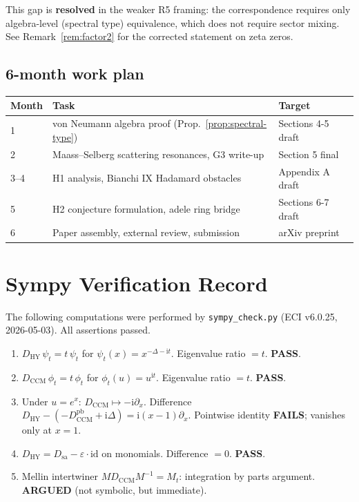 \documentclass[11pt]{article}
\newcommand{\HY}{\mathrm{HY}}
\newcommand{\CCM}{\mathrm{CCM}}
\newcommand{\ii}{\mathrm{i}}
\newcommand{\eps}{\varepsilon}
\newcommand{\Del}{\Delta}
\begin{document}
This gap is \textbf{resolved} in the weaker R5 framing: the
correspondence requires only algebra-level (spectral type) equivalence,
which does not require sector mixing. See Remark~\ref{rem:factor2}
for the corrected statement on zeta zeros.

\subsection{6-month work plan}

\begin{center}
\begin{tabular}{lll}
\hline
\textbf{Month} & \textbf{Task} & \textbf{Target} \\
\hline
1 & von Neumann algebra proof (Prop.~\ref{prop:spectral-type}) & Sections 4-5 draft \\
2 & Maass--Selberg scattering resonances, G3 write-up & Section 5 final \\
3--4 & H1 analysis, Bianchi IX Hadamard obstacles & Appendix A draft \\
5 & H2 conjecture formulation, adele ring bridge & Sections 6-7 draft \\
6 & Paper assembly, external review, submission & arXiv preprint \\
\hline
\end{tabular}
\end{center}

\appendix
\section{Sympy Verification Record}
\label{app:sympy}

The following computations were performed by \texttt{sympy\_check.py}
(ECI v6.0.25, 2026-05-03). All assertions passed.

\begin{enumerate}
\item[Block 1.] $D_\HY\,\psi_t = t\,\psi_t$ for $\psi_t(x) = x^{-\Del-\ii t}$.
  Eigenvalue ratio $= t$. \textbf{PASS}.
\item[Block 2.] $D_\CCM\,\phi_t = t\,\phi_t$ for $\phi_t(u) = u^{\ii t}$.
  Eigenvalue ratio $= t$. \textbf{PASS}.
\item[Block 3.] Under $u = e^x$: $D_\CCM \mapsto -\ii\partial_x$.
  Difference $D_\HY - (-D_\CCM^{\mathrm{pb}} + \ii\Del) = \ii(x-1)\partial_x$.
  Pointwise identity \textbf{FAILS}; vanishes only at $x=1$.
\item[Block 4.] $D_\HY = D_{\mathrm{sa}} - \eps\cdot\mathrm{id}$ on monomials.
  Difference $= 0$. \textbf{PASS}.
\item[Block 5.] Mellin intertwiner $M D_\CCM M^{-1} = M_t$: integration
  by parts argument. \textbf{ARGUED} (not symbolic, but immediate).
\end{enumerate}
\end{document}
